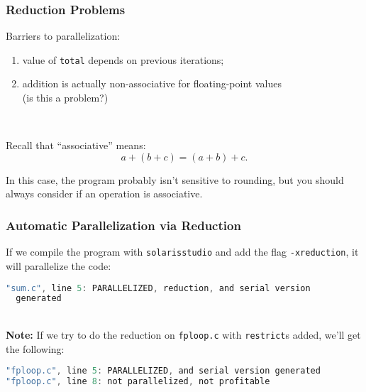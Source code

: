 \begin{frame}[fragile]
  \frametitle{Reduction Problems}


  Barriers to parallelization:
  \begin{enumerate}
    \item value of {\tt total} depends on previous
      iterations;
    \item addition is actually non-associative for floating-point values
      \\ (is this a problem?)
  \end{enumerate}
  ~\\[1em]
  \begin{center}
    Recall that ``associative'' means: 
     \[a + (b + c) = (a + b) + c.\]
  \end{center}
     In this case, the program probably isn't sensitive to rounding,
      but you should always consider if an operation is associative.

\end{frame}

\begin{frame}[fragile]
  \frametitle{Automatic Parallelization via Reduction}


  If we compile the program with {\tt solarisstudio} and add the flag
  {\tt -xreduction}, it will parallelize the code:


  \begin{lstlisting}[language=C]
% solarisstudio-cc -xautopar -xloopinfo -xreduction -O3 -c sum.c 
"sum.c", line 5: PARALLELIZED, reduction, and serial version
  generated
  \end{lstlisting}
~\\[1em]


  {\bf Note:} If we try to do the reduction on {\tt fploop.c} with {\tt restrict}s added, we'll get the following:


  \begin{lstlisting}[language=C]
% solarisstudio-cc -O3 -xautopar -xloopinfo  -xreduction -c fploop.c
"fploop.c", line 5: PARALLELIZED, and serial version generated
"fploop.c", line 8: not parallelized, not profitable
  \end{lstlisting}

\end{frame}

